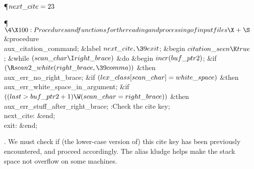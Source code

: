 \Y\P\D {}$\\{next\_cite}=23$\par
\Y\P$\4\X100:Procedures and functions for the reading and processing of input
files\X\mathrel{+}\S$\6
\4\&{procedure}\1\  \\{aux\_citation\_command};\6
\4\&{label} $\\{next\_cite},\39\\{exit}$;\2\6
\&{begin} $\\{citation\_seen}\K\\{true}$;\6
\&{while} $(\\{scan\_char}\I\\{right\_brace})$ \1\&{do}\6
\&{begin} $\\{incr}(\\{buf\_ptr2})$;\6
\&{if} $(\R\\{scan2\_white}(\\{right\_brace},\39\\{comma}))$ \1\&{then}\5
\\{aux\_err\_no\_right\_brace};\2\6
\&{if} $(\\{lex\_class}[\\{scan\_char}]=\\{white\_space})$ \1\&{then}\5
\\{aux\_err\_white\_space\_in\_argument};\2\6
\&{if} $((\\{last}>\\{buf\_ptr2}+1)\W(\\{scan\_char}=\\{right\_brace}))$ \1%
\&{then}\5
\\{aux\_err\_stuff\_after\_right\_brace};\2\6
:Check the cite key\X;\6
\4\\{next\_cite}: \&{end};\2\6
\4\\{exit}: \&{end};\par
\fi

.
We must check if (the lower-case version of) this cite key has been
previously encountered, and proceed accordingly.  The alias kludge
helps make the stack space not overflow on some machines.

